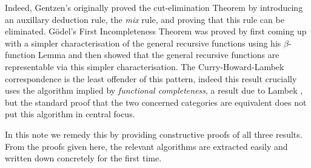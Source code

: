 \documentclass[12pt]{article}
\theoremstyle{plain}
\theoremstyle{definition}
\begin{document}
	Indeed, Gentzen's originally proved the cut-elimination Theorem \cite{Gentzen} by introducing an auxillary deduction rule, the \emph{mix} rule, and proving that this rule can be eliminated. G\"{o}del's First Incompleteness Theorem was proved \cite{Godel} by first coming up with a simpler characterisation of the general recursive functions using his $\beta$-function Lemma and then showed that the general recursive functions are representable via this simpler characterisation. The Curry-Howard-Lambek correspondence is the least offender of this pattern, indeed this result crucially uses the algorithm implied by \emph{functional completeness}, a result due to Lambek \cite{lambek}, but the standard proof that the two concerned categories are equivalent does not put this algorithm in central focus.
	
	In this note we remedy this by providing constructive proofs of all three results. From the proofs given here, the relevant algorithms are extracted easily and written down concretely for the first time.
	
\end{document}
